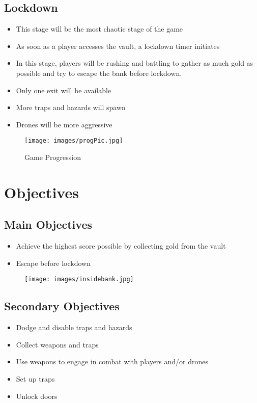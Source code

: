 \documentclass[11pt]{report}
\begin{document}
\subsection{Lockdown}
\begin{itemize}
    \item This stage will be the most chaotic stage of the game
    \item As soon as a player accesses the vault, a lockdown timer initiates
    \item In this stage, players will be rushing and battling to gather as much gold as possible and try to escape the bank before lockdown.
    \item Only one exit will be available
    \item More traps and hazards will spawn
    \item Drones will be more aggressive
\end{itemize}

\begin{figure}[H]
    \centering
    \texttt{[image: images/progPic.jpg]}
    \caption{Game Progression}
\end{figure}

\section{Objectives}
\subsection{Main Objectives}
\begin{itemize}
    \item Achieve the highest score possible by collecting gold from the vault
    \item Escape before lockdown
\end{itemize}

\begin{figure}[H]
    \centering
    \texttt{[image: images/insidebank.jpg]}
    \caption{}
\end{figure}

\subsection{Secondary Objectives}
\begin{itemize}
    \item Dodge and disable traps and hazards
    \item Collect weapons and traps
    \item Use weapons to engage in combat with players and/or drones
    \item Set up traps
    \item Unlock doors
\end{itemize}
\end{document}

